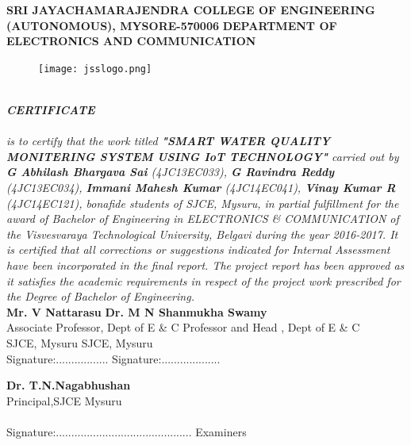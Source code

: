 \documentclass[12pt]{extarticle}
\numberwithin{figure}{section}
\begin{document}


\newpage
\thispagestyle{empty}
\begin{center}
\textbf{SRI JAYACHAMARAJENDRA COLLEGE OF ENGINEERING}
\textbf{(AUTONOMOUS), MYSORE-570006}\linebreak
\textbf{DEPARTMENT OF ELECTRONICS AND COMMUNICATION}
\begin{figure}[h]
\hfill\texttt{[image: jsslogo.png]}\hspace*{\fill}
\end{figure}\\
\textbf{\textit{CERTIFICATE}}
\end{center}
\paragraph{}
\textit{ is to certify that the work titled  \textbf{"SMART WATER QUALITY MONITERING SYSTEM USING IoT TECHNOLOGY"} carried out by \textbf{G Abhilash Bhargava Sai} (4JC13EC033), \textbf{G Ravindra Reddy} (4JC13EC034), \textbf{Immani Mahesh Kumar} (4JC14EC041), \textbf{Vinay Kumar R} (4JC14EC121), bonafide students of SJCE, Mysuru, in partial fulfillment for the award of Bachelor of Engineering in ELECTRONICS \& COMMUNICATION of the Visvesvaraya Technological University, Belgavi during the year 2016-2017. It is certified that all corrections or suggestions indicated for Internal Assessment have been incorporated in the final report. The project report has been approved as it satisfies the academic requirements in respect of the project work prescribed for the Degree of Bachelor of Engineering.}\\
\textbf{Mr. V Nattarasu} \hspace{52mm}\textbf{Dr. M N Shanmukha Swamy}\\
Associate Professor, Dept of E \& C \hspace{25mm}Professor and Head	, Dept of E \& C\\
SJCE, Mysuru \hspace{61mm}	SJCE, Mysuru\\
Signature:.................\hspace{50mm}	Signature:...................\\
\begin{center}
\textbf{Dr. T.N.Nagabhushan}\\
Principal,SJCE Mysuru\\
\hspace{10mm}\\
Signature:............................................
\linebreak
Examiners
\end{center}
\end{document}
